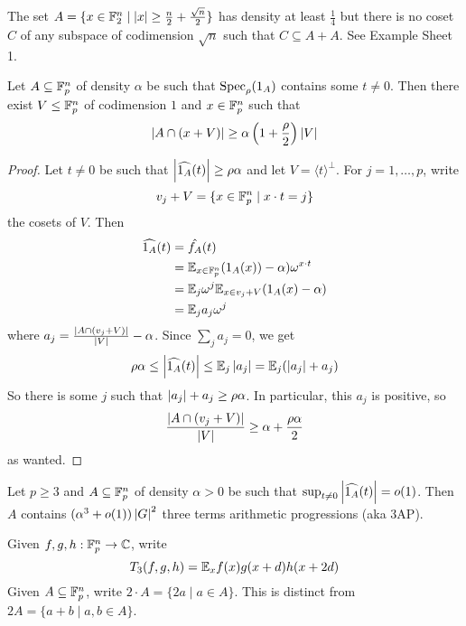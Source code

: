 \documentclass{article}
\begin{document}
\begin{nex}
  The set $A = \{x \in \mathbb F_2^n \mid \left\lvert x\right\rvert \ge \frac n2 + \frac{\sqrt n}2\}$ has density at least $\frac 14$ but there is no coset $C$ of any subspace of codimension $\sqrt n$ such that $C \subseteq A + A$. See Example Sheet 1.
\end{nex}

\begin{nlemma}\label{lem:density-increment}
  Let $A \subseteq \mathbb F_p^n$ of density $\alpha$ be such that $\operatorname{Spec}_\rho(1_A)$ contains some $t \ne 0$. Then there exist $V \le \mathbb F_p^n$ of codimension $1$ and $x \in \mathbb F_p^n$ such that
  $$\left\lvert A \cap (x + V)\right\rvert \ge \alpha\left(1 + \frac\rho 2\right)\left\lvert V\right\rvert$$
\end{nlemma}
\begin{proof}
  Let $t \ne 0$ be such that $\left\lvert \widehat{1_A}(t)\right\rvert \ge \rho\alpha$ and let $V = \langle t\rangle^\perp$. For $j = 1, \dots, p$, write
  $$v_j + V = \{x \in \mathbb F_p^n \mid x \cdot t = j\}$$
  the cosets of $V$. Then
  \begin{align*}
    \widehat{1_A}(t)
    & = \hat{f_A}(t) \\
    & = \mathbb E_{x \in \mathbb F_p^n}(1_A(x)) - \alpha)\omega^{x \cdot t} \\
    & = \mathbb E_j \omega^j \mathbb E_{x \in v_j + V} (1_A(x) - \alpha) \\
    & = \mathbb E_j a_j \omega^j
  \end{align*}
  where $a_j = \frac{\left\lvert A \cap (v_j + V)\right\rvert}{\left\lvert V\right\rvert} - \alpha$. Since $\sum_j a_j = 0$, we get
  $$\rho\alpha \le \left\lvert \widehat{1_A}(t)\right\rvert \le \mathbb E_j \left\lvert a_j\right\rvert = \mathbb E_j (\left\lvert a_j\right\rvert + a_j)$$
  So there is some $j$ such that $\left\lvert a_j\right\rvert + a_j \ge \rho\alpha$. In particular, this $a_j$ is positive, so
   $$\frac{\left\lvert A \cap (v_j + V)\right\rvert}{\left\lvert V\right\rvert} \ge \alpha + \frac{\rho\alpha}2$$
   as wanted.
\end{proof}

\newlec

\begin{nlemma}\label{lem:3AP-estimate}
  Let $p \ge 3$ and $A \subseteq \mathbb F_p^n$ of density $\alpha > 0$ be such that $\sup_{t \ne 0} \left\lvert \widehat{1_A}(t)\right\rvert = o(1)$. Then $A$ contains $(\alpha^3 + o(1))\left\lvert G\right\rvert^2$ three terms arithmetic progressions (aka 3AP).
\end{nlemma}

\begin{notation}
  Given $f, g, h : \mathbb F_p^n \to \mathbb C$, write
  $$T_3(f, g, h) = \mathbb E_x f(x) g(x + d) h(x + 2d)$$
  Given $A \subseteq \mathbb F_p^n$, write $2 \cdot A = \{2a \mid a \in A\}$. This is distinct from $2A = \{a + b \mid a, b \in A\}$.
\end{notation}
\end{document}

